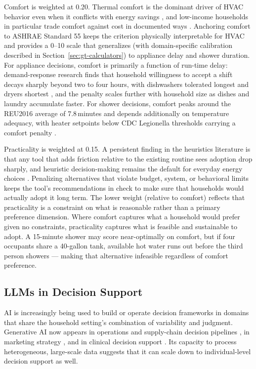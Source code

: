 \documentclass[final,3p,times]{elsarticle}
\begin{document}
Comfort is weighted at 0.20. Thermal comfort is the dominant driver of HVAC behavior even when it conflicts with energy savings \cite{aqilah2022,karjalainen2007,wanghong2020}, and low-income households in particular trade comfort against cost in documented ways \cite{chen2017}. Anchoring comfort to ASHRAE Standard 55 \cite{ashrae55,dedear2002} keeps the criterion physically interpretable for HVAC and provides a 0--10 scale that generalizes (with domain-specific calibration described in Section~\ref{sec:gt-calculators}) to appliance delay and shower duration. For appliance decisions, comfort is primarily a function of run-time delay: demand-response research finds that household willingness to accept a shift decays sharply beyond two to four hours, with dishwashers tolerated longest and dryers shortest \cite{paetz2012,waseem2020}, and the penalty scales further with household size as dishes and laundry accumulate faster. For shower decisions, comfort peaks around the REU2016 average of 7.8\,minutes \cite{reu2016,harrispoll2024} and depends additionally on temperature adequacy, with heater setpoints below CDC Legionella thresholds carrying a comfort penalty \cite{cdc2026}.

Practicality is weighted at 0.15. A persistent finding in the heuristics literature is that any tool that adds friction relative to the existing routine sees adoption drop sharply, and heuristic decision-making remains the default for everyday energy choices \cite{ariely2001,leclerc1995,gardner2020,mergelsberg2020}. Penalizing alternatives that violate budget, system, or behavioral limits keeps the tool's recommendations in check to make sure that households would actually adopt it long term. The lower weight (relative to comfort) reflects that practicality is a constraint on what is reasonable rather than a primary preference dimension. Where comfort captures what a household would prefer given no constraints, practicality captures what is feasible and sustainable to adopt. A 15-minute shower may score near-optimally on comfort, but if four occupants share a 40-gallon tank, available hot water runs out before the third person showers --- making that alternative infeasible regardless of comfort preference.

\subsection{LLMs in Decision Support}

AI is increasingly being used to build or operate decision frameworks
in domains that share the household setting's combination of
variability and judgment. Generative AI now appears in operations and
supply-chain decision pipelines \cite{jackson2024}, in marketing
strategy \cite{huangrust2020}, and in clinical decision support
\cite{simon2024}. Its capacity to process heterogeneous, large-scale
data suggests that it can scale down to individual-level decision
support as well.
\end{document}
